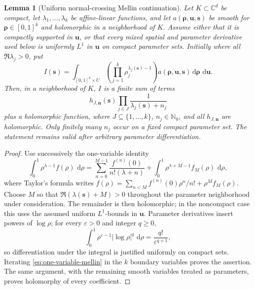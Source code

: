 \documentclass[11pt]{article}
\newtheorem{lemma}[theorem]{Lemma}
\newcommand{\Nzero}{\mathbb N_0}
\newcommand{\C}{\mathbb C}
\newcommand{\dd}{\,\mathrm d}
\begin{document}
\begin{lemma}[Uniform normal-crossing Mellin continuation]
\label{lem:uniform-mellin}
Let \(K\subset\C^d\) be compact, let
\(\lambda_1,\ldots,\lambda_k\) be affine-linear functions, and let
\(a(\boldsymbol\rho,\mathbf u,\mathbf s)\) be smooth for
\(\boldsymbol\rho\in[0,1]^k\) and holomorphic in a neighborhood of
\(K\).  Assume either that it is compactly supported in
\(\mathbf u\), or that every mixed spatial and parameter derivative
used below is uniformly \(L^1\) in \(\mathbf u\) on compact parameter
sets.  Initially where
all \(\Re\lambda_j>0\), put
\[
 I(\mathbf s)=\int_{[0,1]^k\times U}
 \left(\prod_{j=1}^k\rho_j^{\lambda_j(\mathbf s)-1}\right)
 a(\boldsymbol\rho,\mathbf u,\mathbf s)
 \dd\boldsymbol\rho\,\dd\mathbf u.
\]
Then, in a neighborhood of \(K\), \(I\) is a finite sum of terms
\[
 h_{J,\mathbf n}(\mathbf s)
 \prod_{j\in J}\frac1{\lambda_j(\mathbf s)+n_j}
\]
plus a holomorphic function, where
\(J\subseteq\{1,\ldots,k\}\), \(n_j\in\Nzero\), and all
\(h_{J,\mathbf n}\) are holomorphic.  Only finitely many \(n_j\)
occur on a fixed compact parameter set.  The statement remains valid
after arbitrary parameter differentiation.
\end{lemma}

\begin{proof}
Use successively the one-variable identity
\begin{equation}
 \int_0^1\rho^{\lambda-1}f(\rho)\,\dd\rho
 =\sum_{n=0}^{M-1}\frac{f^{(n)}(0)}{n!(\lambda+n)}
  +\int_0^1\rho^{\lambda+M-1}f_M(\rho)\,\dd\rho,
 \label{eq:one-variable-mellin}
\end{equation}
where Taylor's formula writes
\(f(\rho)=\sum_{n<M}f^{(n)}(0)\rho^n/n!+\rho^Mf_M(\rho)\).
Choose \(M\) so that
\(\Re(\lambda(\mathbf s)+M)>0\) throughout the parameter
neighborhood under consideration.  The remainder is then holomorphic; in the noncompact case this uses
the assumed uniform \(L^1\)-bounds in \(\mathbf u\).
Parameter derivatives insert powers of \(\log\rho\); for every
\(\varepsilon>0\) and integer \(q\geq0\),
\[
 \int_0^1\rho^{\varepsilon-1}|\log\rho|^q\,\dd\rho
 =\frac{q!}{\varepsilon^{q+1}},
\]
so differentiation under the integral is justified uniformly on
compact sets.  Iterating \eqref{eq:one-variable-mellin} in the
\(k\) boundary variables proves the assertion.  The same argument,
with the remaining smooth variables treated as parameters, proves
holomorphy of every coefficient.
\end{proof}
\end{document}
